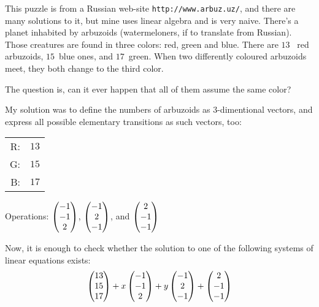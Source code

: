 \begin{exercises}
\begin{answer}
\begin{exparts}
\begin{equation*}
        \end{equation*}
    \end{exparts}  
   \end{answer}
  \puzzle \item 
    \cite{Shepelev}
    This  puzzle  is  from  a  Russian   web-site
    \texttt{http://www.arbuz.uz/},  and  there are many solutions
    to it, but mine uses  linear  algebra  and  is  very
    naive.   There's   a   planet  inhabited  by  arbuzoids
   (watermeloners, if to  translate  from  Russian). 
   Those creatures are found in three colors: red, green and blue.  
   There  are  $13$~ red
   arbuzoids,  $15$~blue  ones, and $17$~green. When
   two differently coloured arbuzoids meet,  they
   both change to the third color.

   The  question  is, can it ever happen that all
   of them assume the same color?
    \begin{answer}
       \answerasgiven
       My solution was to define the numbers  of  arbuzoids
       as $3$-dimentional vectors, and express all possible
       elementary transitions as such vectors, too:
       \begin{center}
         \begin{tabular}{rr}
           R: &$13$  \\
           G: &$15$  \\
           B: &$17$
         \end{tabular}
         \qquad
         Operations:
         $\begin{pmatrix} -1 \\ -1 \\ 2 \end{pmatrix}$, 
         $\begin{pmatrix} -1 \\ 2 \\ -1 \end{pmatrix}$, 
         and 
         $\begin{pmatrix} 2 \\ -1 \\ -1 \end{pmatrix}$
       \end{center}
       Now, it is enough to check whether the  solution  to
       one  of  the  following  systems of linear equations
       exists:
       \begin{equation*}
         \colvec{13 \\ 15 \\ 17}
         +x\colvec{-1 \\ -1  \\ 2}
         +y\colvec{-1 \\ 2 \\ -1}
         +\colvec{2 \\ -1 \\ -1}

\end{equation*}
\end{answer}
\end{exercises}
